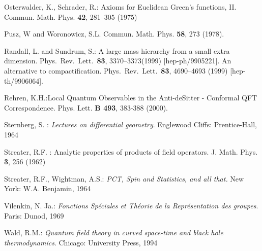 \documentclass[a4paper,a4paper]{article}
\begin{document}
\begin{thebibliography}{99}
 Osterwalder, K., Schrader, R.:
Axioms for Euclidean Green's functions, II. Commun. Math. Phys.
{\bf 42}, 281--305 (1975)

Pusz, W and Woronowicz, S.L. Commun. Math. Phys. {\bf 58}, 273
(1978).

Randall, L. and Sundrum, S.: A large mass hierarchy from a small
extra dimension.  Phys.\ Rev.\ Lett.\  {\bf 83}, 3370--3373(1999)
[hep-ph/9905221]. An alternative to compactification. Phys.\ Rev.\
Lett.\ {\bf 83}, 4690--4693 (1999) [hep-th/9906064].

Rehren, K.H.:Local Quantum Observables in the
Anti-deSitter - Conformal QFT Correspondence.
Phys. Lett. {\bf B 493},  383-388 (2000).

 Sternberg, S. :
{\em Lectures on differential geometry}. Englewood Cliffs:
Prentice-Hall, 1964

 Streater, R.F. :
Analytic properties of products of field operators. J. Math.
Phys. {\bf 3}, 256 (1962)

   Streater, R.F.,  Wightman, A.S.: {\it PCT, Spin and
Statistics, and all that. } New York: W.A. Benjamin, 1964

Vilenkin, N. Ja.: {\it Fonctions Sp\'eciales et Th\'eorie de la
Repr\'esentation des groupes}.  Paris: Dunod, 1969

 Wald, R.M.: {\it Quantum field theory in curved
space-time and black hole thermodynamics}. Chicago: University Press, 1994


























\end{thebibliography}
\end{document}
